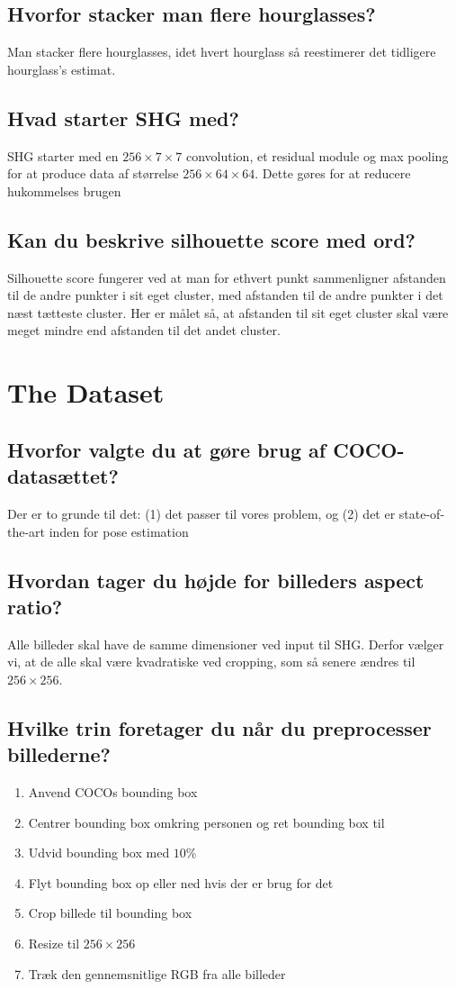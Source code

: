 \documentclass[a4paper]{article}
\begin{document}
\subsection{Hvorfor stacker man flere hourglasses?}
Man stacker flere hourglasses, idet hvert hourglass så reestimerer det tidligere hourglass's estimat.

\subsection{Hvad starter SHG med?}
SHG starter med en $256 \times 7 \times 7$ convolution, et residual module og max pooling for at produce data af størrelse $256 \times 64 \times 64$. Dette gøres for at reducere hukommelses brugen

\subsection{Kan du beskrive silhouette score med ord?}
Silhouette score fungerer ved at man for ethvert punkt sammenligner afstanden til de andre punkter i sit eget cluster, med afstanden til de andre punkter i det næst tætteste cluster. Her er målet så, at afstanden til sit eget cluster skal være meget mindre end afstanden til det andet cluster.

\section{The Dataset}

\subsection{Hvorfor valgte du at gøre brug af COCO-datasættet?}
Der er to grunde til det: (1) det passer til vores problem, og (2) det er state-of-the-art inden for pose estimation

\subsection{Hvordan tager du højde for billeders aspect ratio?}
Alle billeder skal have de samme dimensioner ved input til SHG. Derfor vælger vi, at de alle skal være kvadratiske ved cropping, som så senere ændres til $256 \times 256$.

\subsection{Hvilke trin foretager du når du preprocesser billederne?}
\begin{enumerate}
    \item Anvend COCOs bounding box
    \item Centrer bounding box omkring personen og ret bounding box til
    \item Udvid bounding box med $10\%$
    \item Flyt bounding box op eller ned hvis der er brug for det
    \item Crop billede til bounding box
    \item Resize til $256 \times 256$
    \item Træk den gennemsnitlige RGB fra alle billeder
\end{enumerate}
\end{document}
